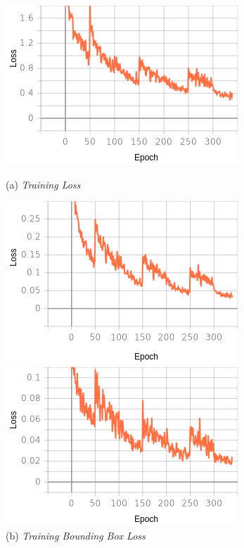 \begin{figure}[H]
	\centering
	\begin{minipage}{0.45\textwidth}
		\includegraphics[width=\textwidth]{gambar/training_resnet50/tugas-akhir-Page-15.png}
		\caption*{(a) \textit{Training Loss}}
	\end{minipage}
	\hfill
	\begin{minipage}{0.45\textwidth}
		\includegraphics[width=\textwidth]{gambar/training_resnet50/tugas-akhir-Page-15 (1).png}
		\caption*{(b) \textit{Training Bounding Box Loss}}
	\end{minipage}
	\vfill
	\begin{minipage}{0.45\textwidth}
		\includegraphics[width=\textwidth]{gambar/training_resnet50/tugas-akhir-Page-15 (2).png}

\end{minipage}
\end{figure}
